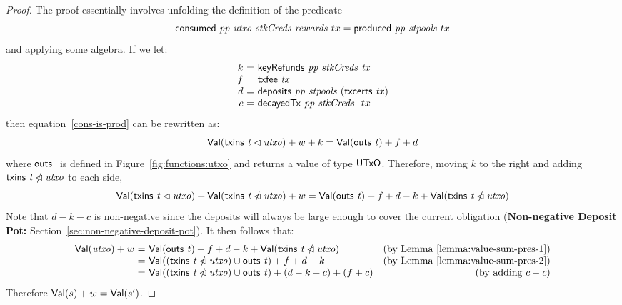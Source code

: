 \begin{proof}
  The proof essentially involves unfolding the definition of the predicate
  \begin{equation}
    \label{cons-is-prod}
    \mathsf{consumed}~ \mathit{pp}~ \mathit{utxo}~ \mathit{stkCreds}~ \mathit{rewards}~{tx} = \mathsf{produced}~ \mathit{pp}~ \mathit{stpools}~{tx}
  \end{equation}
  and applying some algebra.
%
If we let:
  \begin{equation*}
    \begin{array}{r@{~=~}l}
      k & \keyRefunds{pp}{stkCreds}{tx} \\
      f & \txfee{tx} \\
      d & \deposits{pp}{stpools}~{(\txcerts{tx})} \\
      c & \decayedTx{pp}{stkCreds}~{tx} \\
    \end{array}
  \end{equation*}
  then equation~\ref{cons-is-prod} can be rewritten as:
  \begin{equation*}
    \mathsf{Val}(\mathsf{txins}~ \mathit{t} \lhd{\ensuremath{\mathit{utxo}}}) + w + k = \mathsf{Val}(\mathsf{outs}~ \mathit{t}) + f + d
  \end{equation*}
  where $\mathsf{outs}~ \mathit{}$ is defined in Figure~\ref{fig:functions:utxo} and returns a value of type $\mathsf{UTxO}$.
  Therefore, moving $k$ to the right and adding $\mathsf{txins}~ \mathit{t} \mathbin{\slashed{\lhd}}{\mathit{utxo}}$ to each side,
  \begin{equation*}
    \mathsf{Val}(\mathsf{txins}~ \mathit{t} \lhd{\ensuremath{\mathit{utxo}}}) + \mathsf{Val}(\mathsf{txins}~ \mathit{t} \mathbin{\slashed{\lhd}}{\mathit{utxo}}) + w
    = \mathsf{Val}(\mathsf{outs}~ \mathit{t}) + f + d - k + \mathsf{Val}(\mathsf{txins}~ \mathit{t} \mathbin{\slashed{\lhd}}{\mathit{utxo}})
  \end{equation*}
  Note that $d-k-c$ is non-negative since the deposits will always be large enough to cover
  the current obligation (\textbf{Non-negative Deposit Pot:} Section~\ref{sec:non-negative-deposit-pot}).
%
  It then follows that:
  \begin{equation*}
    \begin{array}{r@{~=~}lr}
      \Val(\var{utxo}) + w
    & \Val(\outs{t}) + f + d - k + \Val(\txins{t} \subtractdom{\var{utxo}})
    & \text{(by Lemma~\ref{lemma:value-sum-pres-1})}
    \\
    & \Val((\txins{t} \subtractdom{\var{utxo}})\cup\outs{t}) + f + d - k
    & \text{(by Lemma~\ref{lemma:value-sum-pres-2})}
    \\
    & \Val((\txins{t} \subtractdom{\var{utxo}})\cup\outs{t}) + (d-k-c) + (f+c)
    & \text{(by adding $c-c$)}
    \end{array}
  \end{equation*}
  Therefore $\mathsf{Val}(s) + w = \mathsf{Val}(s')$.
\end{proof}

